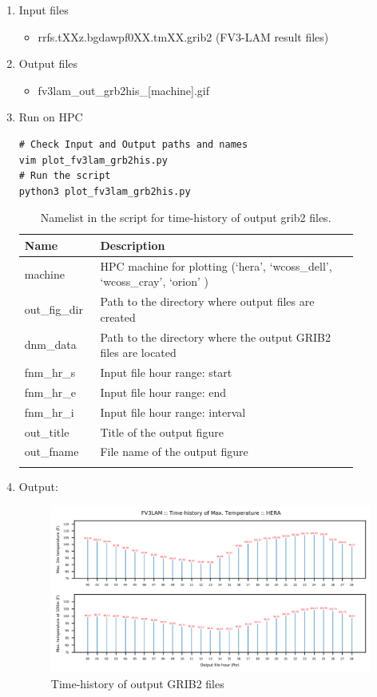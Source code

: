 \documentclass[11pt,fleqn]{report}              %
\begin{document}
\begin{enumerate}
\item Input files
\begin{itemize}
\item rrfs.tXXz.bgdawpf0XX.tmXX.grib2 (FV3-LAM result files)
\end{itemize}

\item Output files
\begin{itemize}
\item fv3lam\_out\_grb2his\_[machine].gif
\end{itemize}

\item Run on HPC
\lstset{language=bash}   
\begin{lstlisting}[frame=trBL]
# Check Input and Output paths and names
vim plot_fv3lam_grb2his.py
# Run the script
python3 plot_fv3lam_grb2his.py
\end{lstlisting}


{
\fontsize{10}{12}\selectfont
\begin{longtable}{p{0.17\linewidth} | p{0.7\linewidth} }
\hline
\hline
Name & Description \\
\hline
 machine & HPC machine for plotting (`hera', `wcoss\_dell', `wcoss\_cray', `orion' ) \\
 out\_fig\_dir & Path to the directory where output files are created \\
 dnm\_data & Path to the directory where the output GRIB2 files are located   \\
 fnm\_hr\_s & Input file hour range: start \\
 fnm\_hr\_e & Input file hour range: end \\
 fnm\_hr\_i & Input file hour range: interval \\ 
 out\_title & Title of the output figure \\
 out\_fname & File name of the output figure  \\
\hline
\caption{Namelist in the script for time-history of output grib2 files.}
\label{table:fv3_var_his_grib2}
\end{longtable}
}

\item Output:

\begin{figure}[ht!]
  \centering
  \includegraphics[width=0.9\linewidth]{fv3lam_out_grb2his_hera.png}
  \caption{Time-history of output GRIB2 files}
  \label{fig:py_out_grb2his}
\end{figure}


\end{enumerate}
\end{document}
